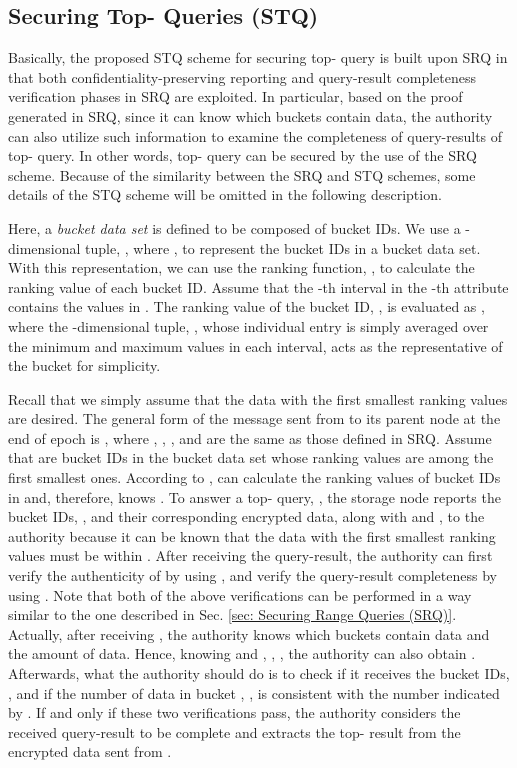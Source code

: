 \documentclass[conference]{IEEEtran}
\begin{document}
\subsection{Securing Top- Queries (STQ)}\label{sec: Securing Top- Queries (STQ)}
Basically, the proposed STQ scheme for securing top- query is built upon SRQ in that both confidentiality-preserving reporting and query-result completeness verification phases in SRQ are exploited. In particular, based on the proof generated in SRQ, since it can know which buckets contain data, the authority can also utilize such information to examine the completeness of query-results of top- query. In other words, top- query can be secured by the use of the SRQ scheme. Because of the similarity between the SRQ and STQ schemes, some details of the STQ scheme will be omitted in the following description.

Here, a \emph{bucket data set} is defined to be composed of bucket IDs. We use a -dimensional tuple, , where , to represent the bucket IDs in a bucket data set. With this representation, we can use the ranking function, , to calculate the ranking value of each bucket ID. Assume that the -th interval in the -th attribute contains the values in . The ranking value of the bucket ID, , is evaluated as , where the -dimensional tuple, , whose individual entry is simply averaged over the minimum and maximum values in each interval, acts as the representative of the bucket  for simplicity.

Recall that we simply assume that the data with the first  smallest ranking values are desired. The general form of the message sent from  to its parent node at the end of epoch  is , where , , , and  are the same as those defined in SRQ. Assume that  are  bucket IDs in the bucket data set whose ranking values are among the first  smallest ones. According to ,  can calculate the ranking values of bucket IDs in  and, therefore, knows . To answer a top- query, , the storage node  reports the bucket IDs, , and their corresponding encrypted data, along with  and , to the authority because it can be known that the data with the first  smallest ranking values must be within . After receiving the query-result, the authority can first verify the authenticity of  by using , and verify the query-result completeness by using . Note that both of the above verifications can be performed in a way similar to the one described in Sec. \ref{sec: Securing Range Queries (SRQ)}. Actually, after receiving , the authority knows which buckets contain data and the amount of data. Hence, knowing  and , , , the authority can also obtain . Afterwards, what the authority should do is to check if it receives the bucket IDs, , and if the number of data in bucket , , is consistent with the number indicated by . If and only if these two verifications pass, the authority considers the received query-result to be complete and extracts the top- result from the encrypted data sent from .
\end{document}
